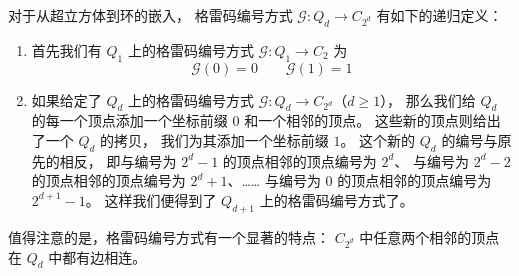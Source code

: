 对于从超立方体到环的嵌入，
格雷码编号方式 $\mathcal{G} \colon Q_d \rightarrow C_{2^d}$ 有如下的递归定义：
\begin{enumerate}[(1)]
	\item 首先我们有 $Q_1$ 上的格雷码编号方式
		$\mathcal{G} \colon Q_1 \rightarrow C_2$ 为
		\begin{equation*}
		\mathcal{G}(0) = 0 \qquad \mathcal{G}(1) = 1
		\end{equation*}
	\item 如果给定了 $Q_d$ 上的格雷码编号方式
		$\mathcal{G} \colon Q_d \rightarrow C_{2^d}$（$d \ge 1$），
		那么我们给 $Q_d$ 的每一个顶点添加一个坐标前缀 $0$ 和一个相邻的顶点。
		这些新的顶点则给出了一个 $Q_d$ 的拷贝，
		我们为其添加一个坐标前缀 $1$。
		这个新的 $Q_d$ 的编号与原先的相反，
		即与编号为 $2^d - 1$ 的顶点相邻的顶点编号为 $2^d$、
		与编号为 $2^d - 2$ 的顶点相邻的顶点编号为 $2^d + 1$、……
		与编号为 $0$ 的顶点相邻的顶点编号为 $2^{d + 1} - 1$。
		这样我们便得到了 $Q_{d + 1}$ 上的格雷码编号方式了。
\end{enumerate}
值得注意的是，格雷码编号方式有一个显著的特点：
$C_{2^d}$ 中任意两个相邻的顶点在 $Q_d$ 中都有边相连。
